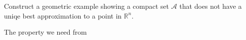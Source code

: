 
\begin{problem}
Construct a geometric example showing a compact set $\mathcal{A}$
that does not have a uniqe best approximation to a point in $\mathds{R}^n$.
\end{problem}

\begin{solution}
  The property we need from
  

\end{solution}

 	

